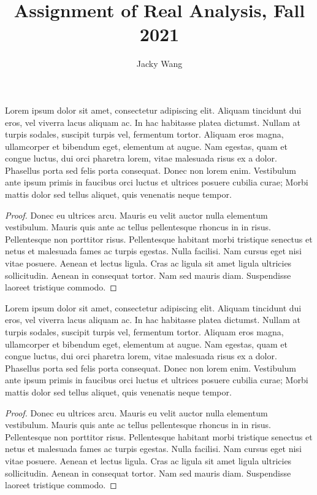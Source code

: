 \documentclass{article}
\title{Assignment of Real Analysis, Fall 2021}
\author{Jacky Wang}
\theoremstyle{definition} \newtheorem{definition}{Definition}[section]
\theoremstyle{plain} \newtheorem{proposition}{Proposition}[section]
\theoremstyle{remark} \newtheorem{example}{Example}[section]
\theoremstyle{plain} \newtheorem{theorem}{Theorem}[section]
\newenvironment{tcbproblem}[1]{
    \begin{tcolorbox}[title = {Problem #1}]
    }{
    \end{tcolorbox}
}
\begin{document}
    \maketitle

    \begin{tcbproblem}{A1.1}
        Lorem ipsum dolor sit amet, consectetur adipiscing elit. Aliquam tincidunt dui eros, vel viverra lacus aliquam ac. In hac habitasse platea dictumst. Nullam at turpis sodales, suscipit turpis vel, fermentum tortor. Aliquam eros magna, ullamcorper et bibendum eget, elementum at augue. Nam egestas, quam et congue luctus, dui orci pharetra lorem, vitae malesuada risus ex a dolor. Phasellus porta sed felis porta consequat. Donec non lorem enim. Vestibulum ante ipsum primis in faucibus orci luctus et ultrices posuere cubilia curae; Morbi mattis dolor sed tellus aliquet, quis venenatis neque tempor.
    \end{tcbproblem}
    \begin{proof}[Proof]
        Donec eu ultrices arcu. Mauris eu velit auctor nulla elementum vestibulum. Mauris quis ante ac tellus pellentesque rhoncus in in risus. Pellentesque non porttitor risus. Pellentesque habitant morbi tristique senectus et netus et malesuada fames ac turpis egestas. Nulla facilisi. Nam cursus eget nisi vitae posuere. Aenean et lectus ligula. Cras ac ligula sit amet ligula ultricies sollicitudin. Aenean in consequat tortor. Nam sed mauris diam. Suspendisse laoreet tristique commodo.
    \end{proof}

    \begin{tcbproblem}{A1.2}
        Lorem ipsum dolor sit amet, consectetur adipiscing elit. Aliquam tincidunt dui eros, vel viverra lacus aliquam ac. In hac habitasse platea dictumst. Nullam at turpis sodales, suscipit turpis vel, fermentum tortor. Aliquam eros magna, ullamcorper et bibendum eget, elementum at augue. Nam egestas, quam et congue luctus, dui orci pharetra lorem, vitae malesuada risus ex a dolor. Phasellus porta sed felis porta consequat. Donec non lorem enim. Vestibulum ante ipsum primis in faucibus orci luctus et ultrices posuere cubilia curae; Morbi mattis dolor sed tellus aliquet, quis venenatis neque tempor.
    \end{tcbproblem}
    \begin{proof}[Proof]
        Donec eu ultrices arcu. Mauris eu velit auctor nulla elementum vestibulum. Mauris quis ante ac tellus pellentesque rhoncus in in risus. Pellentesque non porttitor risus. Pellentesque habitant morbi tristique senectus et netus et malesuada fames ac turpis egestas. Nulla facilisi. Nam cursus eget nisi vitae posuere. Aenean et lectus ligula. Cras ac ligula sit amet ligula ultricies sollicitudin. Aenean in consequat tortor. Nam sed mauris diam. Suspendisse laoreet tristique commodo.
    \end{proof}
\end{document}
